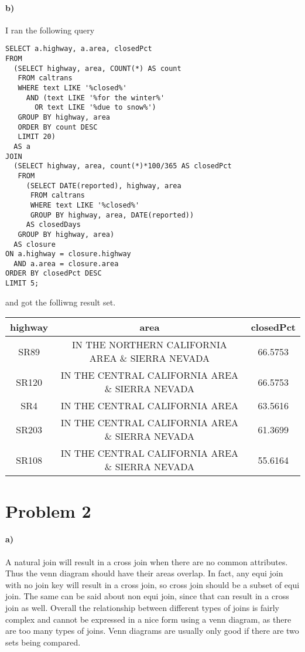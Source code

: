 \documentclass[12pt]{article}
\begin{document}
\paragraph{b)}

I ran the following query
\begin{verbatim}
SELECT a.highway, a.area, closedPct
FROM
  (SELECT highway, area, COUNT(*) AS count
   FROM caltrans
   WHERE text LIKE '%closed%'
     AND (text LIKE '%for the winter%'
       OR text LIKE '%due to snow%')
   GROUP BY highway, area
   ORDER BY count DESC
   LIMIT 20)
  AS a
JOIN
  (SELECT highway, area, count(*)*100/365 AS closedPct
   FROM
     (SELECT DATE(reported), highway, area
      FROM caltrans
      WHERE text LIKE '%closed%'
      GROUP BY highway, area, DATE(reported))
     AS closedDays
   GROUP BY highway, area)
  AS closure
ON a.highway = closure.highway
  AND a.area = closure.area
ORDER BY closedPct DESC
LIMIT 5;
\end{verbatim}
and got the folliwng result set.
\begin{center}
        \hspace*{-1cm}
        \begin{tabular}{c|c|c}
                highway & area & closedPct\\
                \hline
                SR89 & IN THE NORTHERN CALIFORNIA AREA \& SIERRA NEVADA & 66.5753\\
                SR120 & IN THE CENTRAL CALIFORNIA AREA \& SIERRA NEVADA & 66.5753\\
                SR4 & IN THE CENTRAL CALIFORNIA AREA & 63.5616\\
                SR203 & IN THE CENTRAL CALIFORNIA AREA \& SIERRA NEVADA & 61.3699\\
                SR108 & IN THE CENTRAL CALIFORNIA AREA \& SIERRA NEVADA & 55.6164
        \end{tabular}
        \hspace*{-1cm}
\end{center}

\section*{Problem 2}

\paragraph{a)}

A natural join will result in a cross join when there are no common attributes. Thus the venn diagram
should have their areas overlap. In fact, any equi join with no join key will result in a cross join,
so cross join should be a subset of equi join. The same can be said about non equi join, since that can
result in a cross join as well. Overall the relationship between different types of joins is fairly
complex and cannot be expressed in a nice form using a venn diagram, as there are too many types of joins.
Venn diagrams are usually only good if there are two sets being compared.
\end{document}
